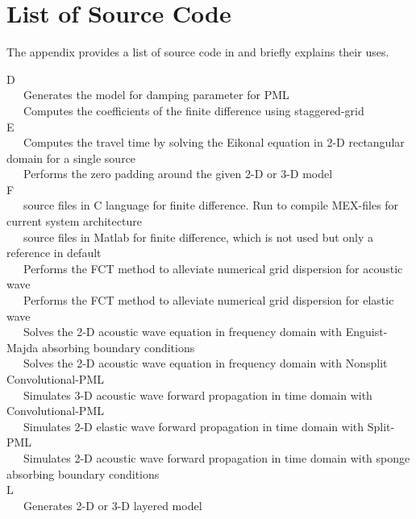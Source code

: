 \documentclass[11pt,titlepage]{article}
\theoremstyle{plain}
\theoremstyle{definition}
\theoremstyle{remark}
\numberwithin{equation}{section}
\begin{document}
\section{List of Source Code}
The appendix provides a list of source code in  and briefly explains their uses. 

\noindent D\\
~~~Generates the model for damping parameter for PML\\
~~~Computes the coefficients of the finite difference using staggered-grid\\

\noindent E\\
~~~Computes the travel time by solving the Eikonal equation in 2-D rectangular domain for a single source\\
~~~Performs the zero padding around the given 2-D or 3-D model\\

\noindent F\\
~~~source files in C language for finite difference. Run  to compile MEX-files for current system architecture\\
~~~source files in Matlab for finite difference, which is not used but only a reference in default\\
~~~Performs the FCT method to alleviate numerical grid dispersion for acoustic wave\\
~~~Performs the FCT method to alleviate numerical grid dispersion for elastic wave\\
~~~Solves the 2-D acoustic wave equation in frequency domain with Enguist-Majda absorbing boundary conditions\\
~~~Solves the 2-D acoustic wave equation in frequency domain with Nonsplit Convolutional-PML\\
~~~Simulates 3-D acoustic wave forward propagation in time domain with Convolutional-PML\\
~~~Simulates 2-D elastic wave forward propagation in time domain with Split-PML\\
~~~Simulates 2-D acoustic wave forward propagation in time domain with sponge absorbing boundary conditions\\

\noindent L\\
~~~Generates 2-D or 3-D layered model\\
\end{document}
